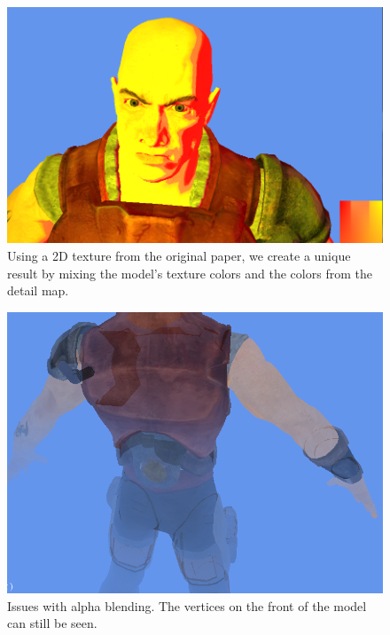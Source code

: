 \documentclass[annual]{acmsiggraph}
\begin{document}
\begin{figure}[h]
  \centering
  \includegraphics[width=5.5in]{images/test}
  \caption{Using a 2D texture from the original paper, we create a unique result by mixing the model's texture colors and the colors from the detail map.}
\end{figure}

\begin{figure}[h]
 \centering
 \includegraphics[width=5.5in]{images/alpha_issues}
 \caption{Issues with alpha blending. The vertices on the front of the model can still be seen.}
 \label{fig:alpha_issue}
\end{figure}
\end{document}
